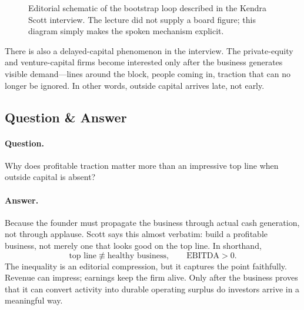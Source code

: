 \begin{figure}[h]
\centering
{}
\caption{Editorial schematic of the bootstrap loop described in the Kendra Scott interview. The lecture did not supply a board figure; this diagram simply makes the spoken mechanism explicit.}
\end{figure}

There is also a delayed-capital phenomenon in the interview. The private-equity and venture-capital firms become interested only after the business generates visible demand---lines around the block, people coming in, traction that can no longer be ignored. In other words, outside capital arrives late, not early.

\subsection{Question \& Answer}

\paragraph{Question.} Why does profitable traction matter more than an impressive top line when outside capital is absent?

\paragraph{Answer.} Because the founder must propagate the business through actual cash generation, not through applause. Scott says this almost verbatim: build a profitable business, not merely one that looks good on the top line. In shorthand,
\begin{equation}
\text{top line} \not\equiv \text{healthy business},
\qquad
\mathrm{EBITDA}>0.
\end{equation}
The inequality is an editorial compression, but it captures the point faithfully. Revenue can impress; earnings keep the firm alive. Only after the business proves that it can convert activity into durable operating surplus do investors arrive in a meaningful way.

